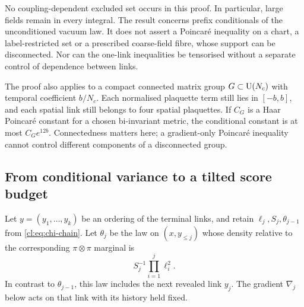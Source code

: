 No coupling-dependent excluded set occurs in this proof. In particular,
large fields remain in every integral. The result concerns prefix
conditionals of the unconditioned vacuum law. It does not assert a
Poincar\'e inequality on a chart, a label-restricted set or a prescribed
coarse-field fibre, whose support can be disconnected. Nor can the
one-link inequalities be tensorised without a separate control of
dependence between links.

The proof also applies to a compact connected matrix group
$G\subset\mathrm{U}(N_c)$ with temporal coefficient $b/N_c$. Each normalised
plaquette term still lies in $[-b,b]$, and each spatial link still belongs
to four spatial plaquettes. If $C_G$ is a Haar Poincar\'e constant for a
chosen bi-invariant metric, the conditional constant is at most
$C_Ge^{12b}$. Connectedness matters here; a gradient-only Poincar\'e
inequality cannot control different components of a disconnected group.

\subsection{From conditional variance to a tilted score budget}
Let $y=(y_1,\ldots,y_k)$ be an ordering of the terminal links, and retain
$\ell_j,S_j,\theta_{j-1}$ from \eqref{cl:eq:chi-chain}. Let $\theta_j$
be the law on $(x,y_{\le j})$ whose density relative to the corresponding
$\pi\otimes\pi$ marginal is
\[
S_j^{-1}\prod_{i=1}^j\ell_i^2.
\]
In contrast to $\theta_{j-1}$, this law includes the next revealed link
$y_j$. The gradient $\nabla_j$ below acts on that link with its history
held fixed.

